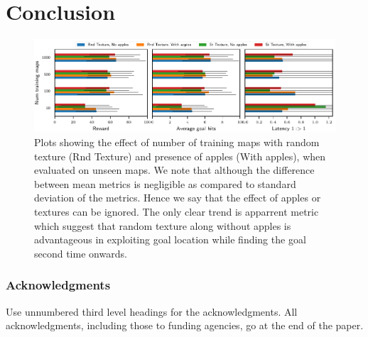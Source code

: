 \documentclass{article} %
\begin{document}
\section{Conclusion}


\begin{figure}%
  \includegraphics[width=\linewidth]{images/plot_ntrain_summary.pdf}%
  \vspace{-1em}%
  \caption{Plots showing the effect of number of training maps with random texture (Rnd Texture) and presence of apples (With apples), when evaluated on unseen maps. We note that although the difference between mean metrics is negligible as compared to standard deviation of the metrics. Hence we say that the effect of apples or textures can be ignored.
  The only clear trend is apparrent \LatencyOneGtOne{} metric which suggest that random texture along without apples is advantageous in exploiting goal location while finding the goal second time onwards.}
  \label{fig:num-training-maps}
\end{figure}

\subsubsection*{Acknowledgments}

Use unnumbered third level headings for the acknowledgments. All
acknowledgments, including those to funding agencies, go at the end of the paper.

{\small
{}

}

\newpage
\end{document}
